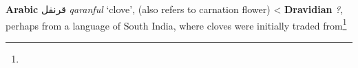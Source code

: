 \begin{etymology}\label{ety:qaranful}
\textbf{Arabic} {قرنفل} \textit{qaranful} `clove', (also refers to carnation flower)
< \textbf{Dravidian} \textit{?}, perhaps from a language of South India, where cloves were initially traded from\footnote{}
\end{etymology}